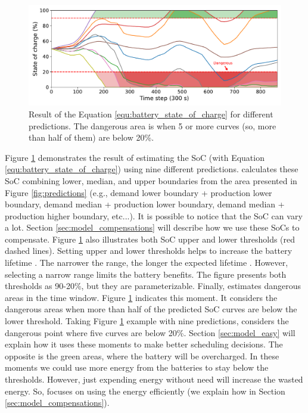 \begin{figure}[!htb]
    \centering
    \includegraphics[scale=0.5]{Images/Heuristic/state_of_charge.pdf}
    \caption[Result of the Equation \ref{equ:battery_state_of_charge} for different predictions.]{Result of the Equation \ref{equ:battery_state_of_charge} for different predictions. The dangerous area is when 5 or more curves (so, more than half of them) are below 20\%.}
    \label{fig:estimated_state_of_charge}
\end{figure}

Figure \ref{fig:estimated_state_of_charge} demonstrates the result of estimating the SoC (with Equation \ref{equ:battery_state_of_charge}) using nine different predictions. \emph{\systemName} calculates these SoC combining lower, median, and upper boundaries from the area presented in Figure \ref{fig:predictions} (e.g., demand lower boundary + production lower boundary, demand median + production lower boundary, demand median + production higher boundary, etc...). It is possible to notice that the SoC can vary a lot. Section \ref{sec:model_compensations} will describe how we use these SoCs to compensate. Figure \ref{fig:estimated_state_of_charge} also illustrates both SoC upper and lower thresholds (red dashed lines). Setting upper and lower thresholds helps to increase the battery lifetime \cite{xu2016modeling}. The narrower the range, the longer the expected lifetime \cite{xu2016modeling}. However, selecting a narrow range limits the battery benefits. The figure presents both thresholds as 90-20\%, but they are parameterizable. Finally, \emph{\systemName} estimates dangerous areas in the time window. Figure \ref{fig:estimated_state_of_charge} indicates this moment. It considers the dangerous areas when more than half of the predicted SoC curves are below the lower threshold. Taking Figure \ref{fig:estimated_state_of_charge} example with nine predictions, \emph{\systemName} considers the dangerous point where five curves are below 20\%. Section \ref{sec:model_easy} will explain how it uses these moments to make better scheduling decisions. The opposite is the green areas, where the battery will be overcharged. In these moments we could use more energy from the batteries to stay below the thresholds. However, just expending energy without need will increase the wasted energy. So, \emph{\systemName} focuses on using the energy efficiently (we explain how in Section \ref{sec:model_compensations}). 

